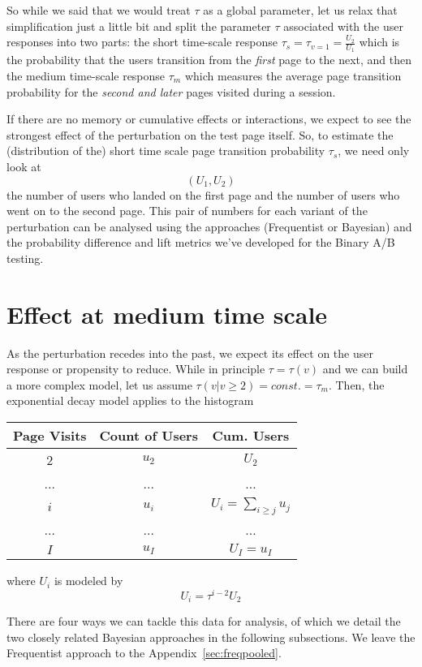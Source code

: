\documentclass[12pt]{report}
\newcommand{\beq}{\begin{equation}} %
\newcommand{\eeq}{\end{equation}} %
\newcommand{\bdm}{\begin{displaymath}} %
\newcommand{\edm}{\end{displaymath}} %
\begin{document}
So while we said that we would treat \(\tau\) as a global parameter,
let us relax that simplification just a little bit and split the
parameter \(\tau\) associated with the user responses into two parts:
the short time-scale response \(\tau_s = \tau_{v=1} =
\frac{U_2}{U_1}\) which is the probability that the users transition
from the {\em first} page to the next, and then the medium time-scale
response \(\tau_m\) which measures the average page transition
probability for the {\em second and later} pages visited during a
session.

If there are no memory or cumulative effects or interactions, we
expect to see the strongest effect of the perturbation on the test
page itself. So, to estimate the (distribution of the) short time
scale page transition probability \(\tau_s\), we need only look at
\bdm
(U_1, U_2)
\edm
the number of users who landed on the first page and the number of
users who went on to the second page. This pair of numbers for each
variant of the perturbation can be analysed using the approaches
(Frequentist or Bayesian) and the probability difference and lift
metrics we've developed for the Binary A/B testing.

\section{Effect at medium time scale}
As the perturbation recedes into the past, we expect its effect on the
user response or propensity to reduce. While in principle \(\tau =
\tau(v)\) and we can build a more complex model, let us assume
\(\tau(v| v\ge 2) = const. = \tau_m\). Then, the exponential decay
model applies to the histogram
\begin{center}\label{table:cum1}
\begin{tabular}{ |c|c|c| } 
 \hline
 Page Visits & Count of Users & Cum. Users \\
 \hline
 2 & \(u_2\) & \(U_2\) \\
 ... & ... & ... \\ 
 \(i\) & \(u_i\) & \(U_i = \sum_{i\ge j}u_j\) \\ 
 ... & ... & ... \\
 \(I\) &\(u_I\) & \(U_I = u_I\) \\
 \hline
\end{tabular}
\end{center}
where \(U_i\) is modeled by
\beq\label{eq:Umedium}
U_i =\tau^{i-2}U_2
\eeq

There are four ways we can tackle this data for analysis, of which we
detail the two closely related Bayesian approaches in the following
subsections.  We leave the Frequentist approach to the
Appendix~\ref{sec:freqpooled}.
\end{document}
